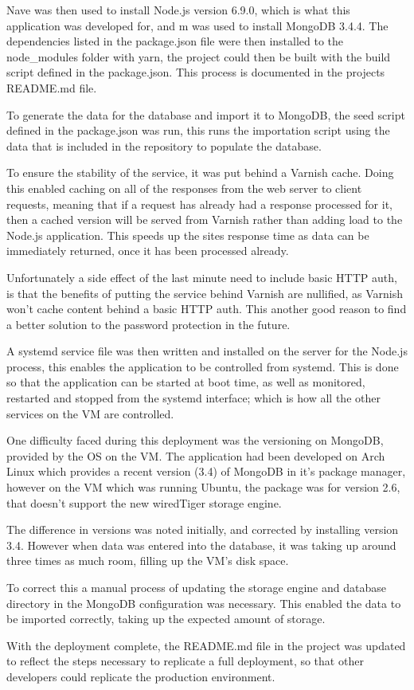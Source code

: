 Nave was then used to install Node.js version 6.9.0, which is what this application was developed for, and m was used to install MongoDB 3.4.4. The dependencies listed in the package.json file were then installed to the node\_modules folder with yarn, the project could then be built with the build script defined in the package.json. This process is documented in the projects README.md file.

To generate the data for the database and import it to MongoDB, the seed script defined in the package.json was run, this runs the importation script using the data that is included in the repository to populate the database.

To ensure the stability of the service, it was put behind a Varnish\cite{varnish} cache. Doing this enabled caching on all of the responses from the web server to client requests, meaning that if a request has already had a response processed for it, then a cached version will be served from Varnish rather than adding load to the Node.js application. This speeds up the sites response time as data can be immediately returned, once it has been processed already.

Unfortunately a side effect of the last minute need to include basic HTTP auth, is that the benefits of putting the service behind Varnish are nullified, as Varnish won't cache content behind a basic HTTP auth. This another good reason to find a better solution to the password protection in the future.

A systemd\cite{systemd} service file was then written and installed on the server for the Node.js process, this enables the application to be controlled from systemd. This is done so that the application can be started at boot time, as well as monitored, restarted and stopped from the systemd interface; which is how all the other services on the VM are controlled.

One difficulty faced during this deployment was the versioning on MongoDB, provided by the OS on the VM. The application had been developed on Arch Linux which provides a recent version (3.4) of MongoDB in it's package manager, however on the VM which was running Ubuntu, the package was for version 2.6, that doesn't support the new wiredTiger\cite{tiger} storage engine. 

The difference in versions was noted initially, and corrected by installing version 3.4. However when data was entered into the database, it was taking up around three times as much room, filling up the VM's disk space. 

To correct this a manual process of updating the storage engine and database directory in the MongoDB configuration was necessary. This enabled the data to be imported correctly, taking up the expected amount of storage. 

With the deployment complete, the README.md file in the project was updated to reflect the steps necessary to replicate a full deployment, so that other developers could replicate the production environment. 
